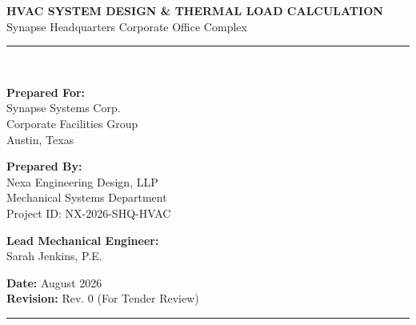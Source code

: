 \begin{center}
  \vspace*{0.5cm}
  {\sffamily\bfseries\Huge\color{primarycolor} HVAC SYSTEM DESIGN \& THERMAL LOAD CALCULATION} \\[0.3cm]
  {\sffamily\Large\color{secondarycolor} Synapse Headquarters Corporate Office Complex} \\[0.5cm]
  \rule{\textwidth}{1.5pt} \\[0.4cm]
\end{center}

\noindent
\begin{minipage}[t]{0.5\textwidth}
  \sffamily
  \textbf{Prepared For:} \\
  Synapse Systems Corp. \\
  Corporate Facilities Group \\
  Austin, Texas
\end{minipage}%
\begin{minipage}[t]{0.5\textwidth}
  \sffamily
  \textbf{Prepared By:} \\
  Nexa Engineering Design, LLP \\
  Mechanical Systems Department \\
  Project ID: NX-2026-SHQ-HVAC
\end{minipage}

\vspace{0.4cm}
\noindent
\begin{minipage}[t]{0.5\textwidth}
  \sffamily
  \textbf{Lead Mechanical Engineer:} \\
  Sarah Jenkins, P.E.
\end{minipage}%
\begin{minipage}[t]{0.5\textwidth}
  \sffamily
  \textbf{Date:} August 2026 \\
  \textbf{Revision:} Rev. 0 (For Tender Review)
\end{minipage}

\vspace{0.6cm}
\rule{\textwidth}{0.5pt}
\vspace{0.8cm}
